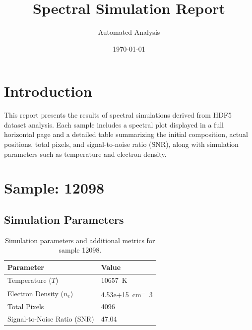 \documentclass[a4paper,11pt]{article}
\title{Spectral Simulation Report}
\author{Automated Analysis}
\date{\today}
\begin{document}
\maketitle
\tableofcontents
\clearpage

\section{Introduction}
This report presents the results of spectral simulations derived from HDF5 dataset analysis. Each sample includes a spectral plot displayed in a full horizontal page and a detailed table summarizing the initial composition, actual positions, total pixels, and signal-to-noise ratio (SNR), along with simulation parameters such as temperature and electron density.


\section{Sample: 12098}
\subsection{Simulation Parameters}
\begin{table}[h!]
    \centering
    \begin{tabular}{ll}
        \toprule
        \textbf{Parameter} & \textbf{Value} \\
        \midrule
        Temperature ($T$) & 10657 \,\si{K} \\
        Electron Density ($n_e$) & 4.53e+15 \,\si{cm^-3} \\
        Total Pixels & 4096 \\
        Signal-to-Noise Ratio (SNR) & 47.04 \\
        \bottomrule
    \end{tabular}
    \caption{Simulation parameters and additional metrics for sample 12098.}
    \label{tab:params_12098}
\end{table}
\end{document}
